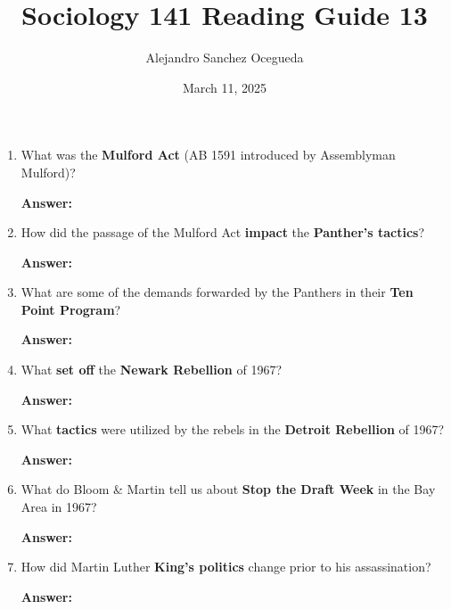\documentclass{article}
\title{Sociology 141 Reading Guide 13}
\author{Alejandro Sanchez Ocegueda}
\date{March 11, 2025}
\newcommand{\answer}{\textbf{Answer:}$\;$}
\begin{document}
\maketitle

\begin{enumerate}[label=\arabic*)]
    \item What was the \textbf{Mulford Act} (AB 1591 introduced by Assemblyman Mulford)?
    
    \answer 
    
    \item How did the passage of the Mulford Act \textbf{impact} the \textbf{Panther's tactics}?
    
    \answer 
    
    
    \item What are some of the demands forwarded by the Panthers in their \textbf{Ten Point Program}?
   

    \answer
    
    \item What \textbf{set off} the \textbf{Newark Rebellion} of 1967?
    
    \answer 
    
    \item What \textbf{tactics} were utilized by the rebels in the \textbf{Detroit Rebellion} of 1967?
    
    \answer
    

    \item What do Bloom \& Martin tell us about \textbf{Stop the Draft Week} in the Bay Area in 1967?
    
    \answer
    
    \item How did Martin Luther \textbf{King's politics} change prior to his assassination?
    
    \answer
    
\end{enumerate}
 
\end{document}
